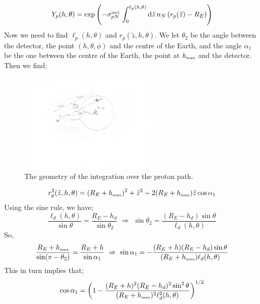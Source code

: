 \documentclass[10pt]{article}
\begin{document}
\begin{equation}
    Y_p(h, \theta) = \exp\left(-\sigma_{pN}^{\textrm{\tiny inel.}}\int_{0}^{\ell_p(h, \theta)}{\text{d}\tilde{z} \,n_N\left(r_p(\tilde{z}) - R_E\right)}\right)
\end{equation}
Now we need to find $\ell_p(h, \theta)$ and $r_p(\tilde{z}, h, \theta)$. We let $\theta_2$ be the angle between the detector, the point $(h, \theta, \phi)$ and the centre of the Earth, and the angle $\alpha_1$ be the one between the centre of the Earth, the point at $h_{\textrm{\tiny max}}$ and the detector. Then we find;
\begin{center}
  \begin{figure}[h]
    \centering
    \includegraphics[width=0.6\textwidth]{pattenuation2.pdf}
    \caption{The geometry of the integration over the proton path.}
    \label{fig:patt2}
  \end{figure}
\end{center}
\begin{equation}
  r^2_p(\tilde{z}, h, \theta) = (R_E + h_{\textrm{\tiny max}})^2 + \tilde{z}^2 - 2(R_E + h_{\textrm{\tiny max}})\tilde{z}\cos\alpha_1
\end{equation}
Using the sine rule, we have;
\begin{equation}
    \frac{\ell_d(h, \theta)}{\sin\theta} = \frac{R_E - h_d}{\sin\theta_2} \,\, \Rightarrow \,\, \sin\theta_2 = \frac{(R_E - h_d)\sin\theta}{\ell_d(h, \theta)}
\end{equation}
So,
\begin{equation}
  \frac{R_E + h_{\textrm{\tiny max}}}{\sin(\pi - \theta_2)} = \frac{R_E + h}{\sin\alpha_1} \,\,\Rightarrow\,\, \sin\alpha_1 = -\frac{(R_E + h)(R_E - h_d)\sin\theta}{(R_E + h_{\textrm{\tiny max}})\ell_d(h, \theta)}
\end{equation}
This in turn implies that;
\begin{equation}
  \cos\alpha_1 = \left(1 - \frac{(R_E + h)^2(R_E - h_d)^2\sin^2\theta}{(R_E + h_{\textrm{\tiny max}})^2\ell^2_d(h, \theta)}\right)^{1/2}
\end{equation}
\end{document}
